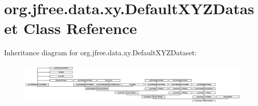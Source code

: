 \hypertarget{classorg_1_1jfree_1_1data_1_1xy_1_1_default_x_y_z_dataset}{}\section{org.\+jfree.\+data.\+xy.\+Default\+X\+Y\+Z\+Dataset Class Reference}
\label{classorg_1_1jfree_1_1data_1_1xy_1_1_default_x_y_z_dataset}
Inheritance diagram for org.\+jfree.\+data.\+xy.\+Default\+X\+Y\+Z\+Dataset\+:\begin{figure}[H]
\begin{center}
\leavevmode
\includegraphics[height=2.051282cm]{classorg_1_1jfree_1_1data_1_1xy_1_1_default_x_y_z_dataset}
\end{center}
\end{figure}
